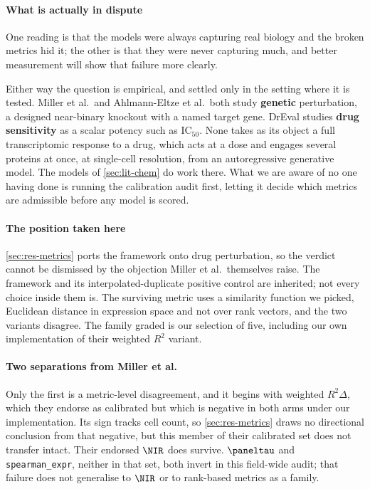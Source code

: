 \paragraph{What is actually in dispute} One reading is that the models were
always capturing real biology and the broken metrics hid it; the other is that
they were never capturing much, and better measurement will show that failure
more clearly.

Either way the question is empirical, and settled only in the setting where it is
tested. Miller et al.\ and Ahlmann-Eltze et al.\ both study \textbf{genetic}
perturbation, a designed near-binary knockout with a named target gene. DrEval
studies \textbf{drug sensitivity} as a scalar potency such as IC$_{50}$. None
takes as its object a full transcriptomic response to a drug, which acts at a
dose and engages several proteins at once, at single-cell resolution, from an
autoregressive generative model. The models of \cref{sec:lit-chem} do work
there. What we are aware of no one having done is running the calibration audit
first, letting it decide which metrics are admissible before any model is
scored.

\paragraph{The position taken here}
\cref{sec:res-metrics} ports the \DRF{} framework onto drug perturbation, so the
verdict cannot be dismissed by the objection Miller et al.\ themselves raise. The
framework and its interpolated-duplicate positive control are inherited; not
every choice inside them is. The surviving metric uses a similarity function we
picked, Euclidean distance in expression space and not over rank vectors, and the
two variants disagree. The family graded is our selection of five, including our
own implementation of their weighted $R^2$ variant.

\paragraph{Two separations from Miller et al.} Only the first is a metric-level
disagreement, and it begins with weighted $R^2\Delta$, which
they endorse as calibrated but which is negative in both arms under our
implementation. Its sign tracks cell count, so \cref{sec:res-metrics} draws no
directional conclusion from that negative, but this member of their calibrated
set does not transfer intact. Their endorsed $\NIR$ does survive. $\paneltau$ and
\texttt{spearman\_expr}, neither in that set, both invert in this field-wide
audit; that failure does not generalise to $\NIR$ or to rank-based metrics as a
family.

